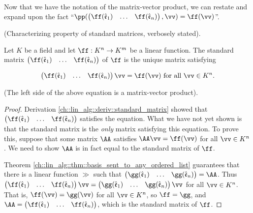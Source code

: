 Now that we have the notation of the matrix-vector product, we can restate and expand upon the fact ``$\pp(\begin{pmatrix} \ff(\see_1) & \hdots & \ff(\see_n) \end{pmatrix}, \vv) = \ff(\vv)$''.

\begin{theorem}
    (Characterizing property of standard matrices, verbosely stated).
    
    Let $K$ be a field and let $\ff:K^n \rightarrow K^m$ be a linear function. The standard matrix $\begin{pmatrix} \ff(\see_1) & \hdots & \ff(\see_n) \end{pmatrix}$ of $\ff$ is the unique matrix satisfying
    
    \begin{align*}
        \begin{pmatrix} \ff(\see_1) & \hdots & \ff(\see_n) \end{pmatrix} \vv = \ff(\vv) \text{ for all $\vv \in K^n$}.
    \end{align*}
    
    (The left side of the above equation is a matrix-vector product).
\end{theorem}

\begin{proof}
   Derivation \ref{ch::lin_alg::deriv::standard_matrix} showed that $\begin{pmatrix} \ff(\see_1) & \hdots & \ff(\see_n) \end{pmatrix}$ satisfies the equation. What we have not yet shown is that the standard matrix is the \textit{only} matrix satisfying this equation. To prove this, suppose that some  matrix $\AA$ satisfies $\AA \vv = \ff(\vv)$ for all $\vv \in K^n$. We need to show $\AA$ is in fact equal to the standard matrix of $\ff$.
   
   Theorem \ref{ch::lin_alg::thm::basis_sent_to_any_ordered_list} guarantees that there is a linear function $\gg$ such that $\begin{pmatrix} \gg(\see_1) & \hdots & \gg(\see_n) \end{pmatrix} = \AA$. Thus $\begin{pmatrix} \ff(\see_1) & \hdots & \ff(\see_n) \end{pmatrix} \vv = \begin{pmatrix} \gg(\see_1) & \hdots & \gg(\see_n) \end{pmatrix} \vv$ for all $\vv \in K^n$. That is, $\ff(\vv) = \gg(\vv)$ for all $\vv \in K^n$, so $\ff = \gg$, and $\AA = \begin{pmatrix} \ff(\see_1) & \hdots & \ff(\see_n) \end{pmatrix}$, which is the standard matrix of $\ff$.
\end{proof}

